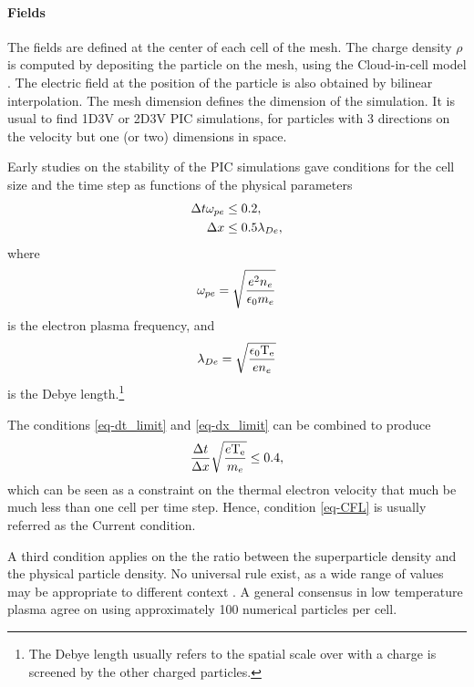     \paragraph{Fields\\}
    The fields are defined at the center of each cell of the mesh.
    The charge density $\rho$ is computed by depositing the particle on the mesh, using the Cloud-in-cell model \cite{birdsall1991}.
    The electric field at the position of the particle is also obtained by bilinear interpolation.
    The mesh dimension defines the dimension of the simulation.
    It is usual to find \acs{1D}\acs{3V} or \acs{2D}\acs{3V} \ac{PIC} simulations, for particles with 3 directions on the velocity but one (or two) dimensions in space.
    
    Early studies on the stability of the \ac{PIC} simulations gave conditions for the cell size and the time step as functions of the physical parameters \citep{birdsall1991,turner2013}
    \begin{align}
      \Delta t  \omega_{pe} &\leq 0.2,  \label{eq-dt_limit} \\
      \Delta x &\leq 0.5 \lambda_{De}, \label{eq-dx_limit}
    \end{align}
    where 
    \begin{equation} \label{eq-def_ope}
      \omega_{pe} =  \sqrt{\frac{e^2 n_e}{ \epsilon_0 m_e}}
    \end{equation}
    is the electron plasma frequency, and 
    \begin{equation} \label{eq-def_lde}
        \lambda_{De} = \sqrt{\frac{ \epsilon_0 \mathrm{T_e}}{e n_e}} 
    \end{equation}
    is the Debye length.\footnote{The Debye length usually refers to the spatial scale over with a charge is screened by the other charged particles. }
    
    The conditions \ref{eq-dt_limit} and \ref{eq-dx_limit} can be combined to produce 
    \begin{equation} \label{eq-CFL}
      \frac{\Delta t}{\Delta x}\sqrt{\frac{e \mathrm{T_e}}{m_e}} \leq 0.4,
    \end{equation}
    which can be seen as a constraint on the thermal electron velocity that much be much less than one cell per time step.
    Hence, condition \ref{eq-CFL} is usually referred as the Current condition.
    
    A third condition applies on the  the ratio between the superparticle density and the physical particle density. 
    No universal rule exist, as a wide range of values may be appropriate to different context \citep{turner2006,turner2013}.
    A general consensus in low temperature plasma agree on using approximately 100 numerical particles per cell.
    
